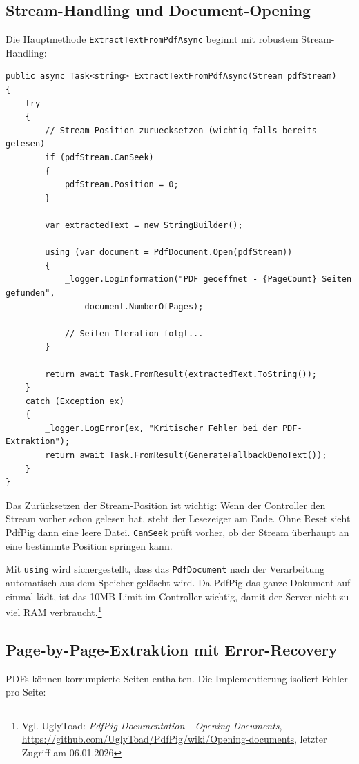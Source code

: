 \subsection{Stream-Handling und Document-Opening}
Die Hauptmethode \texttt{ExtractTextFromPdfAsync} beginnt mit robustem Stream-Handling:

\begin{lstlisting}[language={[Sharp]C}, caption={PDF Stream-Verarbeitung}, label={lst:pdf_stream}]
public async Task<string> ExtractTextFromPdfAsync(Stream pdfStream)
{
    try
    {
        // Stream Position zuruecksetzen (wichtig falls bereits gelesen)
        if (pdfStream.CanSeek)
        {
            pdfStream.Position = 0;
        }

        var extractedText = new StringBuilder();
        
        using (var document = PdfDocument.Open(pdfStream))
        {
            _logger.LogInformation("PDF geoeffnet - {PageCount} Seiten gefunden", 
                document.NumberOfPages);

            // Seiten-Iteration folgt...
        }

        return await Task.FromResult(extractedText.ToString());
    }
    catch (Exception ex)
    {
        _logger.LogError(ex, "Kritischer Fehler bei der PDF-Extraktion");
        return await Task.FromResult(GenerateFallbackDemoText());
    }
}
\end{lstlisting}

Das Zurücksetzen der Stream-Position ist wichtig: Wenn der Controller den Stream vorher schon gelesen hat, steht der Lesezeiger am Ende. Ohne Reset sieht PdfPig dann eine leere Datei. \texttt{CanSeek} prüft vorher, ob der Stream überhaupt an eine bestimmte Position springen kann.

Mit \texttt{using} wird sichergestellt, dass das \texttt{PdfDocument} nach der Verarbeitung automatisch aus dem Speicher gelöscht wird. Da PdfPig das ganze Dokument auf einmal lädt, ist das 10MB-Limit im Controller wichtig, damit der Server nicht zu viel RAM verbraucht.\footnote{Vgl. UglyToad: \textit{PdfPig Documentation - Opening Documents}, \url{https://github.com/UglyToad/PdfPig/wiki/Opening-documents}, letzter Zugriff am 06.01.2026}

\subsection{Page-by-Page-Extraktion mit Error-Recovery}
PDFs können korrumpierte Seiten enthalten. Die Implementierung isoliert Fehler pro Seite:

